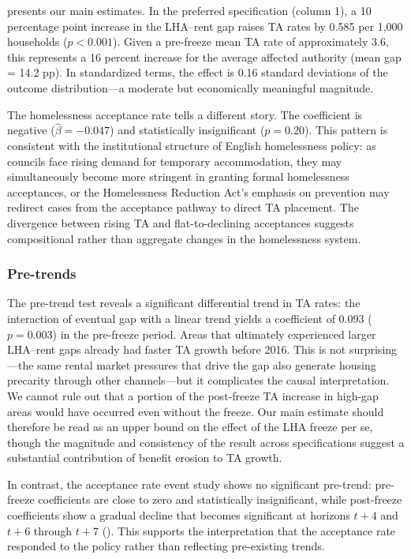 \documentclass[12pt]{article}
\begin{document}


 presents our main estimates. In the preferred specification (column 1), a 10 percentage point increase in the LHA--rent gap raises TA rates by 0.585 per 1,000 households ($p < 0.001$). Given a pre-freeze mean TA rate of approximately 3.6, this represents a 16 percent increase for the average affected authority (mean gap = 14.2 pp). In standardized terms, the effect is 0.16 standard deviations of the outcome distribution---a moderate but economically meaningful magnitude.

The homelessness acceptance rate tells a different story. The coefficient is negative ($\hat{\beta} = -0.047$) and statistically insignificant ($p = 0.20$). This pattern is consistent with the institutional structure of English homelessness policy: as councils face rising demand for temporary accommodation, they may simultaneously become more stringent in granting formal homelessness acceptances, or the Homelessness Reduction Act's emphasis on prevention may redirect cases from the acceptance pathway to direct TA placement. The divergence between rising TA and flat-to-declining acceptances suggests compositional rather than aggregate changes in the homelessness system.

\subsubsection*{Pre-trends} The pre-trend test reveals a significant differential trend in TA rates: the interaction of eventual gap with a linear trend yields a coefficient of 0.093 ($p = 0.003$) in the pre-freeze period. Areas that ultimately experienced larger LHA--rent gaps already had faster TA growth before 2016. This is not surprising---the same rental market pressures that drive the gap also generate housing precarity through other channels---but it complicates the causal interpretation. We cannot rule out that a portion of the post-freeze TA increase in high-gap areas would have occurred even without the freeze. Our main estimate should therefore be read as an upper bound on the effect of the LHA freeze per se, though the magnitude and consistency of the result across specifications suggest a substantial contribution of benefit erosion to TA growth.

In contrast, the acceptance rate event study shows no significant pre-trend: pre-freeze coefficients are close to zero and statistically insignificant, while post-freeze coefficients show a gradual decline that becomes significant at horizons $t+4$ and $t+6$ through $t+7$ (). This supports the interpretation that the acceptance rate responded to the policy rather than reflecting pre-existing trends.
\end{document}
